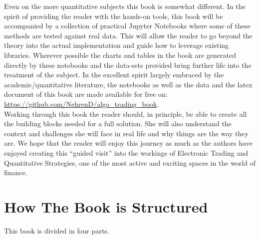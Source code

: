 Even on the more quantitative subjects this book is somewhat different. In the spirit of providing the reader with the hands-on tools, this book will be accompanied by a collection of practical Jupyter Notebooks where some of these methods are tested against real data. This will allow the reader to go beyond the theory into the actual implementation and guide how to leverage existing libraries. Wherever possible the charts and tables in the book are generated directly by these notebooks and the data-sets provided bring further life into the treatment of the subject. In the excellent spirit largely embraced by the academic/quantitative literature, the notebooks as well as the data and the latex document of this book are made  available for free on: \url{https://github.com/NehrenD/algo_trading_book}.\\

Working through this book the reader should, in principle, be able to create all the building blocks needed for a full solution. She will also understand the context and challenges she will face in real life and why things are the way they are. We hope that the reader will enjoy this journey as much as the authors have enjoyed creating this ``guided visit'' into the workings of Electronic Trading and Quantitative Strategies, one of the most active and exciting spaces in the world of finance.



\section{How The Book is Structured}

This book is divided in four parts. 

